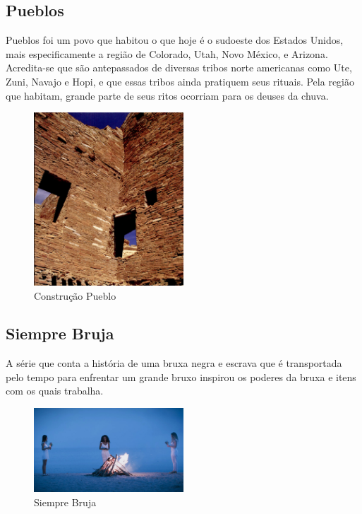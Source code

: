 \subsection{Pueblos}

Pueblos foi  um povo que habitou o que hoje é o sudoeste dos Estados Unidos,
mais especificamente a região de Colorado, Utah, Novo México, e
Arizona.\cite{civPerdidas2017,lyneis1995virgin}
Acredita-se que são antepassados de diversas tribos norte americanas como Ute,
Zuni, Navajo e Hopi, e que essas tribos ainda pratiquem seus rituais. Pela
região que habitam, grande parte de seus ritos ocorriam para os deuses da
chuva\cite{abreu94}.

\clearpage

\begin{figure}[!htb] \caption{\label{fig_puebloan}Construção Pueblo} \begin{center}
\includegraphics[width=0.5\textwidth]{imagens/puebloans.png} \end{center}
 \end{figure}


\subsection{Siempre Bruja}

A série que conta a história de uma bruxa negra e escrava que é transportada
pelo tempo para enfrentar um grande bruxo inspirou os poderes da bruxa e itens
com os quais trabalha.

\begin{figure}[!htb] \caption{\label{siempre}Siempre Bruja} \begin{center}
\includegraphics[width=0.5\textwidth]{imagens/SiempreBruja.jpg} \end{center}
 \end{figure}


